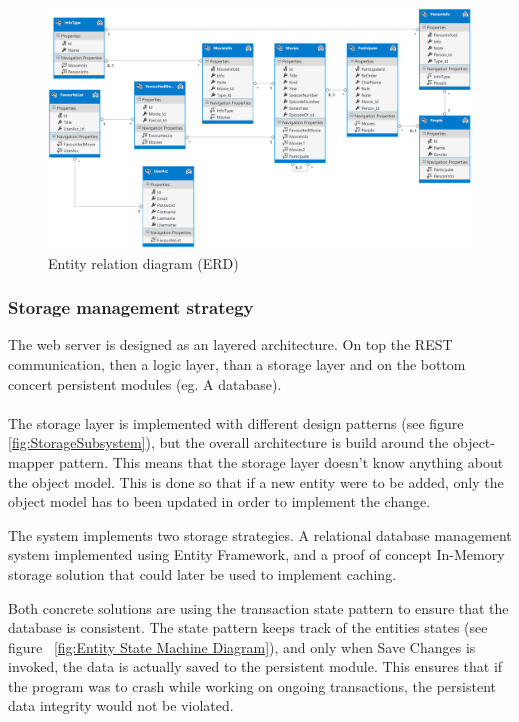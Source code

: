 \begin{figure}[H]
\includegraphics[width=\linewidth]{img/SDD/ER.png}
\caption{Entity relation diagram (ERD)}
\label{fig:ER Diagram}
\end{figure}

\subsubsection{Storage management strategy}
The web server is designed as an layered architecture. On top the REST communication, then a logic layer, than a storage layer and on the bottom concert persistent modules (eg. A database).\\\\
The storage layer is implemented with different design patterns (see figure \ref{fig:StorageSubsystem}), but the overall architecture is build around the object-mapper pattern. This means that the storage layer doesn't know anything about the object model. This is done so that if a new entity were to be added, only the object model has to been updated in order to implement the change. 

The system implements two storage strategies. A relational database management system implemented using Entity Framework, and a proof of concept In-Memory storage solution that could later be used to implement caching. 

Both concrete solutions are using the transaction state pattern to ensure that the database is consistent. The state pattern keeps track of the entities states (see figure ~\ref{fig:Entity State Machine Diagram}), and only when Save Changes is invoked, the data is actually saved to the persistent module. This ensures that if the program was to crash while working on ongoing transactions, the persistent data integrity would not be violated.  

